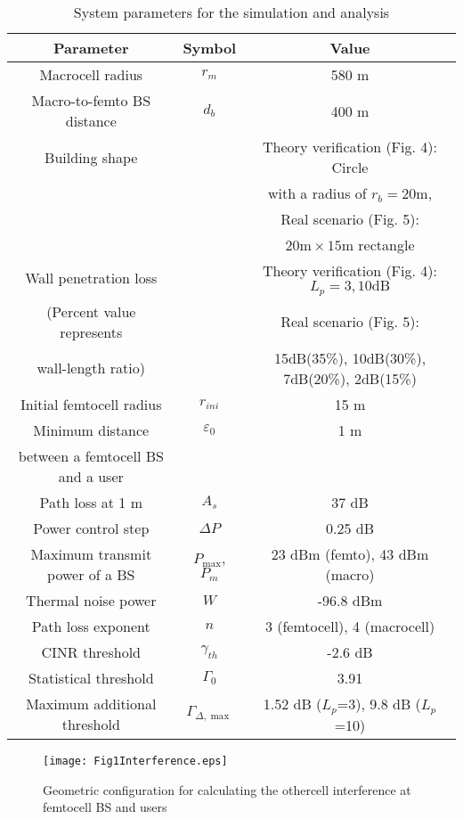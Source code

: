 \documentclass[draftclsnofoot,12pt,onecolumn]{IEEEtran}
\begin{document}
\newpage
\begin{table}
\caption{System parameters for the simulation and analysis}
\label{table_1}
\begin{center}
\begin{tabular}{c|c|c}
  \hline
  Parameter & Symbol & Value \\ \hline \hline
  Macrocell radius & $r_m$ & 580 m \\ \hline
  Macro-to-femto BS distance & $d_b$ & 400 m \\ \hline
  Building shape & & Theory verification (Fig. 4): Circle \\
  &&with a radius of $r_b=20\mathrm{m}$,\\
  & & Real scenario (Fig. 5): \\
  &&$20\mathrm{m} \times 15\mathrm{m}$ rectangle \\ \hline
  Wall penetration loss && Theory verification (Fig. 4):$L_p=3, 10 \mathrm{dB} $\\
  (Percent value represents &&Real scenario (Fig. 5): \\
  wall-length ratio) &&15dB(35\%), 10dB(30\%), 7dB(20\%), 2dB(15\%)\\ \hline
  Initial femtocell radius & $r_{ini}$ & 15 m \\ \hline
Minimum distance & $\varepsilon_0$ & 1 m \\
  between a femtocell BS and a user  & \\ \hline
  Path loss at 1 m & $A_s$ & 37 dB \\ \hline
  Power control step & $\Delta P$ & 0.25 dB \\ \hline
  Maximum transmit power of a BS & $P_{\max}$, $P_m$ & 23 dBm (femto), 43 dBm (macro) \\ \hline
Thermal noise power & $W$ & -96.8 dBm \\ \hline
  Path loss exponent & $n$ & 3 (femtocell), 4 (macrocell) \\ \hline
  CINR threshold & $\gamma_{th}$ & -2.6 dB \\ \hline
  Statistical threshold & $\Gamma_0$ & 3.91 \\ \hline
  Maximum additional threshold & $\Gamma_{\Delta,\max}$ & 1.52 dB ($L_p$=3), 9.8 dB ($L_p$=10)\\ \hline
\end{tabular}
\end{center}
\end{table}
\newpage


\begin{figure}
\begin{center}
   \texttt{[image: Fig1Interference.eps]}
    \caption{Geometric configuration for calculating the othercell interference at femtocell BS and users}
    \label{fig:Interference}
\end{center}
\end{figure}
\end{document}
